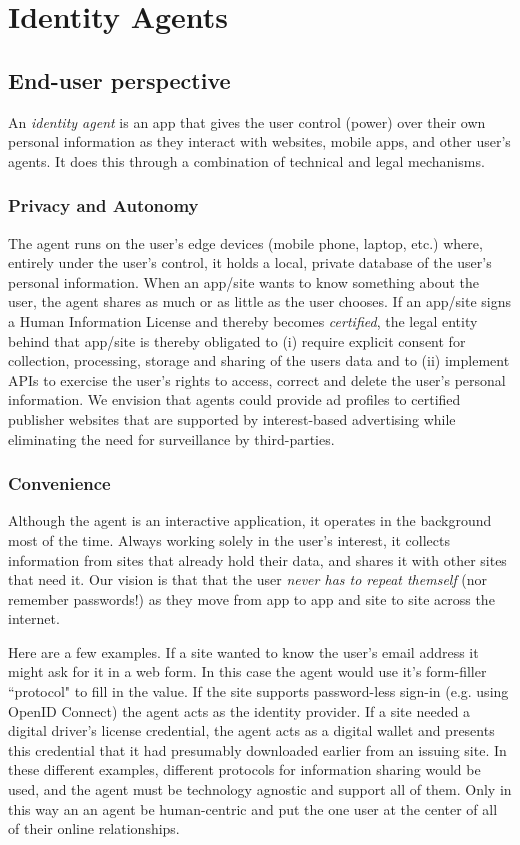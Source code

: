 \documentclass[11pt, oneside]{article}   	%
\begin{document}
\section{Identity Agents} 

\subsection{End-user perspective}
An \emph{identity agent} is an app that gives the user control (power) over their own personal information as they interact with websites, mobile apps, and other user's agents. It does this through a combination of technical and legal mechanisms.

\subsubsection{Privacy and Autonomy} 
The agent runs on the user's edge devices (mobile phone, laptop, etc.) where, entirely under the user's control, it holds a local, private database of the user's personal information. When an app/site wants to know something about the user, the agent shares as much or as little as the user chooses. If an app/site signs a Human Information License and thereby becomes \emph{certified}, the legal entity behind that app/site is thereby obligated to (i) require explicit consent for collection, processing, storage and sharing of the users data and to (ii) implement APIs to exercise the user's rights to access, correct and delete the user's personal information. We envision that agents could provide ad profiles to certified publisher websites that are supported by interest-based advertising while eliminating the need for surveillance by third-parties.

\subsubsection{Convenience}
Although the agent is an interactive application, it operates in the background most of the time. Always working solely in the user's interest, it collects information from sites that already hold their data, and shares it with other sites that need it. Our vision is that that the user \emph{never has to repeat themself} (nor remember passwords!) as they move from app to app and site to site across the internet.

Here are a few examples. If a site wanted to know the user's email address it might ask for it in a web form. In this case the agent would use it's form-filler ``protocol" to fill in the value. If the site supports password-less sign-in (e.g. using OpenID Connect) the agent acts as the identity provider. If a site needed a digital driver's license credential, the agent acts as a digital wallet and presents this credential that it had presumably downloaded earlier from an issuing site. In these different examples, different protocols for information sharing would be used, and the agent must be technology agnostic and support all of them. Only in this way an an agent be human-centric and put the one user at the center of all of their online relationships.
\end{document}
